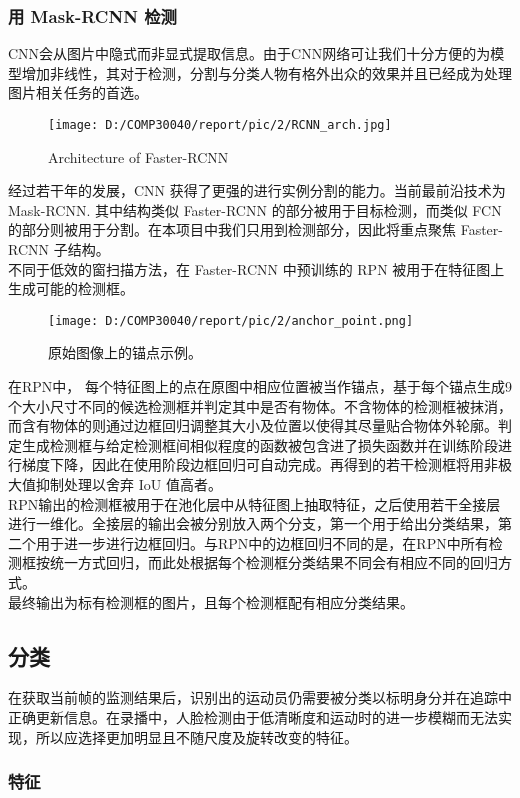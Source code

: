 \documentclass{article}
\begin{document}
\subsubsection{用 Mask-RCNN 检测}
CNN会从图片中隐式而非显式提取信息。由于CNN网络可让我们十分方便的为模型增加非线性，其对于检测，分割与分类人物有格外出众的效果并且已经成为处理图片相关任务的首选。\\
\begin{figure}
  \centering
  \texttt{[image: D:/COMP30040/report/pic/2/RCNN\_arch.jpg]} 
  \caption{Architecture of Faster-RCNN}
\end{figure}
经过若干年的发展，CNN 获得了更强的进行实例分割的能力。当前最前沿技术为 Mask-RCNN. 其中结构类似 Faster-RCNN 的部分被用于目标检测，而类似 FCN 的部分则被用于分割。在本项目中我们只用到检测部分，因此将重点聚焦 Faster-RCNN 子结构。\\
不同于低效的窗扫描方法，在 Faster-RCNN 中预训练的 RPN 被用于在特征图上生成可能的检测框。\\
\begin{figure}
  \centering
  \texttt{[image: D:/COMP30040/report/pic/2/anchor\_point.png]} 
  \caption{原始图像上的锚点示例。}
\end{figure}
在RPN中， 每个特征图上的点在原图中相应位置被当作锚点，基于每个锚点生成9个大小尺寸不同的候选检测框并判定其中是否有物体。不含物体的检测框被抹消，而含有物体的则通过边框回归调整其大小及位置以使得其尽量贴合物体外轮廓。判定生成检测框与给定检测框间相似程度的函数被包含进了损失函数并在训练阶段进行梯度下降，因此在使用阶段边框回归可自动完成。再得到的若干检测框将用非极大值抑制处理以舍弃 IoU 值高者。\\
RPN输出的检测框被用于在池化层中从特征图上抽取特征，之后使用若干全接层进行一维化。全接层的输出会被分别放入两个分支，第一个用于给出分类结果，第二个用于进一步进行边框回归。与RPN中的边框回归不同的是，在RPN中所有检测框按统一方式回归，而此处根据每个检测框分类结果不同会有相应不同的回归方式。\\
最终输出为标有检测框的图片，且每个检测框配有相应分类结果。
\subsection{分类}
在获取当前帧的监测结果后，识别出的运动员仍需要被分类以标明身分并在追踪中正确更新信息。在录播中，人脸检测由于低清晰度和运动时的进一步模糊而无法实现，所以应选择更加明显且不随尺度及旋转改变的特征。
\subsubsection{特征}
\end{document}
